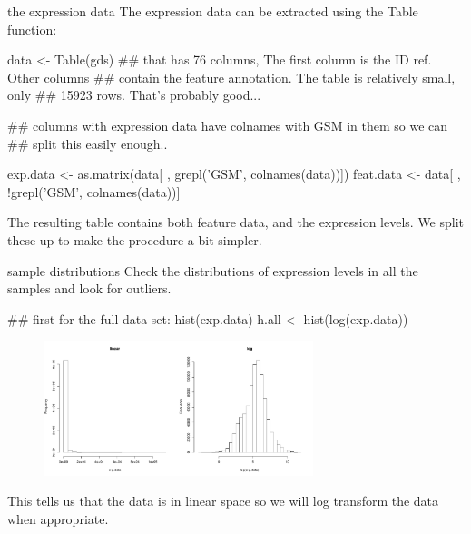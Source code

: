 \documentclass[pdf]{beamer}
\begin{document}
\begin{frame}[fragile]{the expression data}
  The expression data can be extracted using the Table
  function:
  
  \begin{rcode}
    data <- Table(gds)
    ## that has 76 columns, The first column is the ID ref. Other columns
    ## contain the feature annotation. The table is relatively small, only
    ## 15923 rows. That's probably good...
    
    ## columns with expression data have colnames with GSM in them so we can
    ## split this easily enough..
    
    exp.data <- as.matrix(data[ , grepl('GSM', colnames(data))])
    feat.data <- data[ , !grepl('GSM', colnames(data))]
  \end{rcode}
  
  The resulting table contains both feature data, and the expression levels.
  We split these up to make the procedure a bit simpler.
\end{frame}

\begin{frame}[fragile]{sample distributions}
\small
Check the distributions of expression levels in
all the samples and look for outliers.

\begin{rcode}
  ## first for the full data set:
  hist(exp.data)
  h.all <- hist(log(exp.data))
\end{rcode}

\begin{figure}[ht]
  \includegraphics[width=0.7\textwidth]{images/all_hist}
\end{figure}
This tells us that the data is in linear space so we will log transform
the data when appropriate.
\end{frame}
\end{document}
